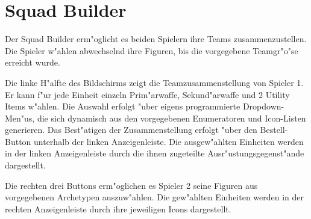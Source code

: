 \chapter{Squad Builder}

Der Squad Builder erm"oglicht es beiden Spielern ihre Teams zusammenzustellen. Die Spieler w"ahlen abwechselnd ihre Figuren, bis die vorgegebene Teamgr"o"se erreicht wurde. 

Die linke H"alfte des Bildschirms zeigt die Teamzusammenstellung von Spieler 1. Er kann f"ur jede Einheit einzeln Prim"arwaffe, Sekund"arwaffe und 2 Utility Items w"ahlen. Die Auswahl erfolgt "uber eigens programmierte Dropdown-Men"us, die sich dynamisch aus den vorgegebenen Enumeratoren und Icon-Listen generieren. Das Best"atigen der Zusammenstellung erfolgt "uber den Bestell-Button unterhalb der linken Anzeigenleiste.   
Die ausgew"ahlten Einheiten werden in der linken Anzeigenleiste durch die ihnen zugeteilte Ausr"ustungsgegenst"ande dargestellt.  

Die rechten drei Buttons erm"oglichen es Spieler 2 seine Figuren aus vorgegebenen Archetypen auszuw"ahlen. Die gew"ahlten Einheiten werden in der rechten Anzeigenleiste durch ihre jeweiligen Icons dargestellt. 


